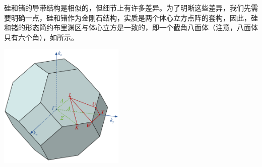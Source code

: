 \dotfill\vspace{0.1ex}

硅和锗的导带结构是相似的，但细节上有许多差异。为了明晰这些差异，我们先需要明确一点，硅和锗作为金刚石结构，实质是两个体心立方点阵的套构，因此，硅和锗的形态简约布里渊区与体心立方是一致的，即一个截角八面体（注意，八面体只有六个角），如所示。\cite{W5}

\begin{Figure}[金刚石结构的简约布里渊区]
    \includegraphics[width=6cm]{image/Brillouin_Zone.pdf}
\end{Figure}

